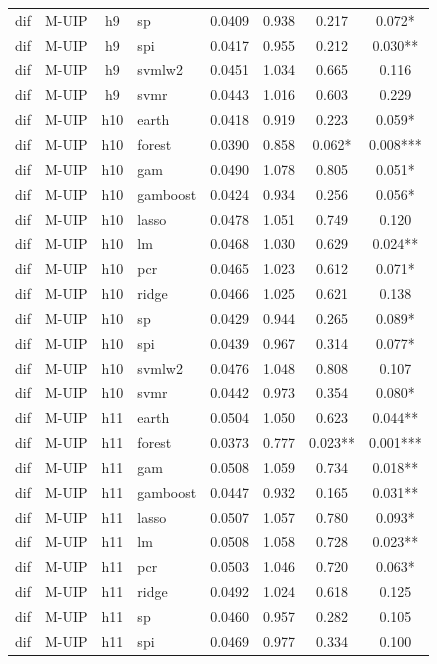 \begin{ThreePartTable}
\begin{longtable}[t]{llclcccc}
dif & M-UIP & h9 & sp & 0.0409 & 0.938 & 0.217 & 0.072*\\
dif & M-UIP & h9 & spi & 0.0417 & 0.955 & 0.212 & 0.030**\\
dif & M-UIP & h9 & svmlw2 & 0.0451 & 1.034 & 0.665 & 0.116\\
dif & M-UIP & h9 & svmr & 0.0443 & 1.016 & 0.603 & 0.229\\
\addlinespace
dif & M-UIP & h10 & earth & 0.0418 & 0.919 & 0.223 & 0.059*\\
dif & M-UIP & h10 & forest & 0.0390 & 0.858 & 0.062* & 0.008***\\
dif & M-UIP & h10 & gam & 0.0490 & 1.078 & 0.805 & 0.051*\\
dif & M-UIP & h10 & gamboost & 0.0424 & 0.934 & 0.256 & 0.056*\\
dif & M-UIP & h10 & lasso & 0.0478 & 1.051 & 0.749 & 0.120\\
dif & M-UIP & h10 & lm & 0.0468 & 1.030 & 0.629 & 0.024**\\
dif & M-UIP & h10 & pcr & 0.0465 & 1.023 & 0.612 & 0.071*\\
dif & M-UIP & h10 & ridge & 0.0466 & 1.025 & 0.621 & 0.138\\
dif & M-UIP & h10 & sp & 0.0429 & 0.944 & 0.265 & 0.089*\\
dif & M-UIP & h10 & spi & 0.0439 & 0.967 & 0.314 & 0.077*\\
dif & M-UIP & h10 & svmlw2 & 0.0476 & 1.048 & 0.808 & 0.107\\
dif & M-UIP & h10 & svmr & 0.0442 & 0.973 & 0.354 & 0.080*\\
\addlinespace
dif & M-UIP & h11 & earth & 0.0504 & 1.050 & 0.623 & 0.044**\\
dif & M-UIP & h11 & forest & 0.0373 & 0.777 & 0.023** & 0.001***\\
dif & M-UIP & h11 & gam & 0.0508 & 1.059 & 0.734 & 0.018**\\
dif & M-UIP & h11 & gamboost & 0.0447 & 0.932 & 0.165 & 0.031**\\
dif & M-UIP & h11 & lasso & 0.0507 & 1.057 & 0.780 & 0.093*\\
dif & M-UIP & h11 & lm & 0.0508 & 1.058 & 0.728 & 0.023**\\
dif & M-UIP & h11 & pcr & 0.0503 & 1.046 & 0.720 & 0.063*\\
dif & M-UIP & h11 & ridge & 0.0492 & 1.024 & 0.618 & 0.125\\
dif & M-UIP & h11 & sp & 0.0460 & 0.957 & 0.282 & 0.105\\
dif & M-UIP & h11 & spi & 0.0469 & 0.977 & 0.334 & 0.100\\

\end{longtable}
\end{ThreePartTable}
